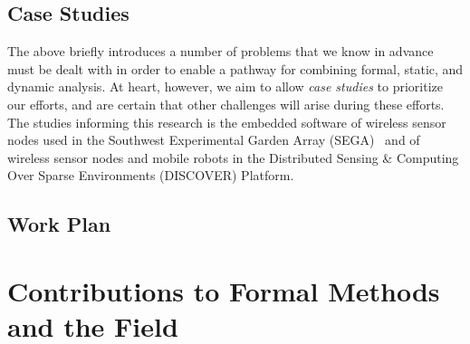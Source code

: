 \subsection{Case Studies} %
\label{sec:case-study}

The above briefly introduces a number of problems that we know in advance must
be dealt with in order to enable a pathway for combining formal,
static, and dynamic analysis.    At heart, however, we aim to allow
\emph{case studies} to prioritize our efforts, and
are certain that other challenges will arise during these efforts.
The studies informing this research is the embedded software of wireless sensor nodes used in the Southwest Experimental Garden Array (SEGA)~\cite{ClaEtAl11,GhoEtAl2014,BelEtAl2015} and of wireless sensor nodes and mobile robots in the Distributed Sensing \& Computing Over Sparse Environments (DISCOVER) Platform.




% 

\subsection{Work Plan}


\section{Contributions to Formal Methods and the Field}
\label{sec:contributions}



